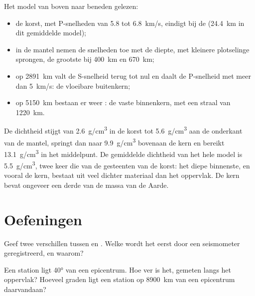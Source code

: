 Het model van boven naar beneden gelezen:
\begin{itemize}
  \item de korst, met P-snelheden van 5.8 tot \qty{6.8}{km/s}, eindigt bij de 
        (\qty{24.4}{km} in dit gemiddelde model);
  \item in de mantel nemen de snelheden toe met de diepte, met kleinere plotselinge
        sprongen, de grootste bij \qty{400}{km} en \qty{670}{km};
  \item op \qty{2891}{km} valt de S-snelheid terug tot nul en daalt de P-snelheid
        met meer dan \qty{5}{km/s}: de vloeibare buitenkern;
  \item op \qty{5150}{km} bestaan er weer : de vaste binnenkern,
        met een straal van \qty{1220}{km}.
\end{itemize}

De dichtheid stijgt van \qty{2.6}{g/cm^3} in de korst tot
\qty{5.6}{g/cm^3} aan de onderkant van de mantel, springt dan naar
\qty{9.9}{g/cm^3} bovenaan de kern en bereikt \qty{13.1}{g/cm^3} in het
middelpunt. De gemiddelde dichtheid van het hele model is \qty{5.5}{g/cm^3}, twee
keer die van de gesteenten van de korst: het diepe binnenste, en vooral de kern,
bestaat uit veel dichter materiaal dan het oppervlak. De kern bevat ongeveer een
derde van de massa van de Aarde.

\section{Oefeningen}

\begin{exercise}[$\star$]\label{exo:g11:seismic-structure:1}
Geef twee verschillen tussen  en . Welke wordt het eerst door een
seismometer geregistreerd, en waarom?
\end{exercise}

\begin{exercise}[$\star$]\label{exo:g11:seismic-structure:2}
Een station ligt \ang{40} van een epicentrum. Hoe ver is het, gemeten langs het
oppervlak? Hoeveel graden ligt een station op \qty{8900}{km} van een epicentrum
daarvandaan?
\end{exercise}

